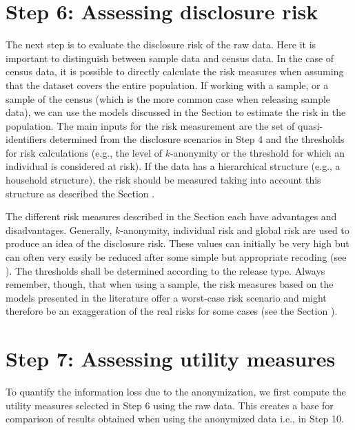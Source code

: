 \documentclass[letterpaper,10pt,english]{sphinxmanual}
\begin{document}
\section{Step 6: Assessing disclosure risk}
\label{\detokenize{process:step-6-assessing-disclosure-risk}}
The next step is to evaluate the disclosure risk of the raw data. Here
it is important to distinguish between sample data and census data. In
the case of census data, it is possible to directly calculate the risk
measures when assuming that the dataset covers the entire population. If
working with a sample, or a sample of the census (which is the more
common case when releasing sample data), we can use the models discussed
in the Section 
to estimate the risk in the population. The main inputs for
the risk measurement are the set of quasi-identifiers determined from
the disclosure scenarios in Step 4 and the thresholds for risk
calculations (e.g., the level of \(k\)-anonymity or the threshold
for which an individual is considered at risk). If the data has a
hierarchical structure (e.g., a household structure), the risk should be
measured taking into account this structure as described the Section
.

The different risk measures described in the Section
 each have advantages
and disadvantages. Generally, \(k\)-anonymity, individual
risk and global risk are used to produce an idea of the disclosure risk.
These values can initially be very high but can often very easily be
reduced after some simple but appropriate recoding (see
{\hyperref[\detokenize{process:step-8-choice-and-application-of-sdc-methods}]{}}). The
thresholds shall be determined according to the release type. Always
remember, though, that when using a sample, the risk measures based on
the models presented in the literature offer a worst-case risk scenario
and might therefore be an exaggeration of the real risks for some cases
(see the Section ).


\section{Step 7: Assessing utility measures}
\label{\detokenize{process:step-7-assessing-utility-measures}}
To quantify the information loss due to the anonymization, we first
compute the utility measures selected in Step 6 using the raw data. This
creates a base for comparison of results obtained when using the
anonymized data \textendash{} i.e., in Step 10.
\end{document}
